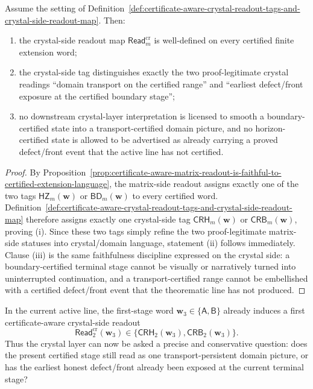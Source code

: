 \begin{proposition}
\label{prop:certificate-aware-crystal-readout-is-faithful-to-the-matrix-side-horizon-boundary-tag}
Assume the setting of Definition~\ref{def:certificate-aware-crystal-readout-tags-and-crystal-side-readout-map}. Then:
\begin{enumerate}[label=(\roman*)]
 \item the crystal-side readout map \(\mathsf{Read}^{\mathrm{cr}}_{m}\) is well-defined on every certified finite extension word;
 \item the crystal-side tag distinguishes exactly the two proof-legitimate crystal readings ``domain transport on the certified range'' and ``earliest defect/front exposure at the certified boundary stage'';
 \item no downstream crystal-layer interpretation is licensed to smooth a boundary-certified state into a transport-certified domain picture, and no horizon-certified state is allowed to be advertised as already carrying a proved defect/front event that the active line has not certified.
\end{enumerate}
\end{proposition}

\begin{proof}
By Proposition~\ref{prop:certificate-aware-matrix-readout-is-faithful-to-certified-extension-language}, the matrix-side readout assigns exactly one of the two tags \(\mathsf{HZ}_{m}(\mathbf w)\) or \(\mathsf{BD}_{m}(\mathbf w)\) to every certified word. Definition~\ref{def:certificate-aware-crystal-readout-tags-and-crystal-side-readout-map} therefore assigns exactly one crystal-side tag \(\mathsf{CRH}_{m}(\mathbf w)\) or \(\mathsf{CRB}_{m}(\mathbf w)\), proving (i). Since these two tags simply refine the two proof-legitimate matrix-side statuses into crystal/domain language, statement (ii) follows immediately. Clause (iii) is the same faithfulness discipline expressed on the crystal side: a boundary-certified terminal stage cannot be visually or narratively turned into uninterrupted continuation, and a transport-certified range cannot be embellished with a certified defect/front event that the theorematic line has not produced.
\end{proof}

\begin{corollary}
\label{cor:present-sigma3-package-already-induces-first-certificate-aware-crystal-reading}
In the current active line, the first-stage word \(\mathbf w_3\in\{\mathsf A,\mathsf B\}\) already induces a first certificate-aware crystal-side readout
\[
 \mathsf{Read}^{\mathrm{cr}}_{2}(\mathbf w_3)
 \in
 \{\mathsf{CRH}_{2}(\mathbf w_3),\mathsf{CRB}_{2}(\mathbf w_3)\}.
\]
Thus the crystal layer can now be asked a precise and conservative question: does the present certified stage still read as one transport-persistent domain picture, or has the earliest honest defect/front already been exposed at the current terminal stage?
\end{corollary}

